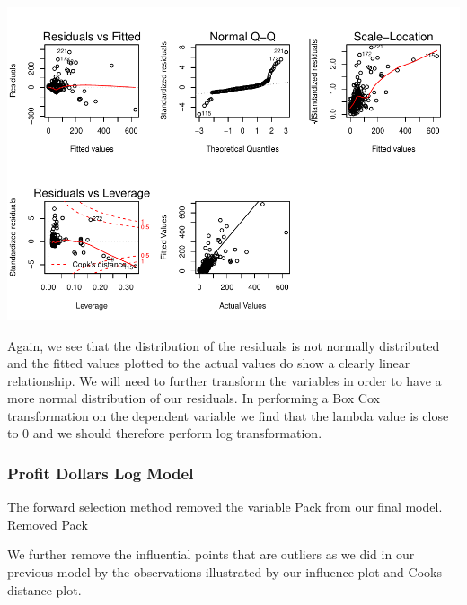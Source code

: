 \documentclass[]{elsarticle} %
\makeatletter
\def\maxwidth{\ifdim\Gin@nat@width>\linewidth\linewidth
\else\Gin@nat@width\fi}
\let\Oldincludegraphics\includegraphics
\renewcommand{\includegraphics}[1]{\Oldincludegraphics[width=\maxwidth]{#1}}
\makeatother
\begin{document}
\includegraphics{Final_Project_files/figure-latex/unnamed-chunk-19-1.pdf}

Again, we see that the distribution of the residuals is not normally
distributed and the fitted values plotted to the actual values do show a
clearly linear relationship. We will need to further transform the
variables in order to have a more normal distribution of our residuals.
In performing a Box Cox transformation on the dependent variable we find
that the lambda value is close to 0 and we should therefore perform log
transformation.

\subsubsection{Profit Dollars Log Model}\label{profit-dollars-log-model}

The forward selection method removed the variable Pack from our final
model. Removed Pack

We further remove the influential points that are outliers as we did in
our previous model by the observations illustrated by our influence plot
and Cooks distance plot.
\end{document}
